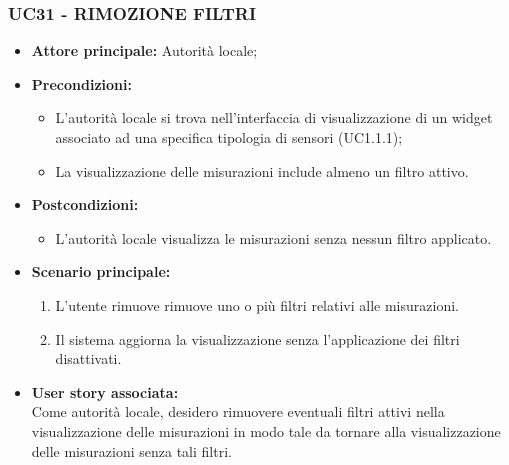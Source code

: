 \subsubsection{UC31 - RIMOZIONE FILTRI}
\begin{itemize}
    \item \textbf{Attore principale:} Autorità locale;
    \item \textbf{Precondizioni:}
        \begin{itemize}
        \item L'autorità locale si trova nell'interfaccia di visualizzazione di un widget associato ad una specifica tipologia di sensori (UC1.1.1);
        \item La visualizzazione delle misurazioni include almeno un filtro attivo.
        \end{itemize}
    \item \textbf{Postcondizioni:}
        \begin{itemize}
            \item L'autorità locale visualizza le misurazioni senza nessun filtro applicato.
        \end{itemize}
    \item \textbf{Scenario principale:}
        \begin{enumerate}
            \item L'utente rimuove rimuove uno o più filtri relativi alle misurazioni.
            \item Il sistema aggiorna la visualizzazione senza l'applicazione dei filtri disattivati.
        \end{enumerate}
    \item \textbf{User story associata:} \\
        Come autorità locale, desidero rimuovere eventuali filtri attivi nella visualizzazione delle misurazioni in modo tale da tornare alla visualizzazione delle misurazioni senza tali filtri.
\end{itemize}
